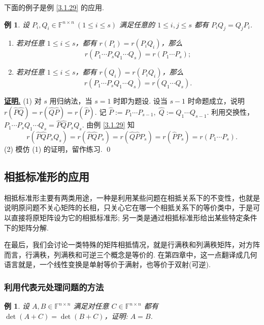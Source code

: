 \documentclass[10pt,openany]{article}
\theoremstyle{thmstyle} %
\theoremstyle{defstyle} %
\theoremstyle{prostyle} %
\theoremstyle{exastyle}
\newtheorem{example}[theorem]{例}
\theoremstyle{remstyle}
\renewenvironment{proof}[1][证明]{\par\underline{\textbf{#1.}} \;\fangsong}{\qed\par}
\newcommand{\F}{\mathbb{F}}
\newcommand{\n}{^{n \times n}}
\begin{document}
下面的例子是例 \ref{3.1.29} 的应用.

\begin{example}
	设 \(  P_i,Q_i \in \F\n \ (1 \leq i \leq s) \) 满足任意的 \( 1 \leq i,j \leq s \) 都有 \( P_iQ_j=Q_jP_i \). 
	\begin{enumerate}[(1)]
		\item 若对任意 \( 1 \leq i \leq s \)，都有 \( r(P_i)=r(P_iQ_i) \)，那么
		\[ r(P_1\cdots P_s Q_1\cdots Q_s)=r(P_1\cdots P_s); \]
		\item 若对任意 \( 1 \leq i \leq s \)，都有 \( r(Q_i)=r(P_iQ_i) \)，那么
		\[ r(P_1\cdots P_s Q_1\cdots Q_s)=r(Q_1\cdots Q_s). \]
	\end{enumerate}
\end{example}

\begin{proof}
	(1) 对 \( s \) 用归纳法，当 \( s=1 \) 时即为题设. 设当 \( s-1 \) 时命题成立，说明 \( r(\hat{P} \hat{Q})=r(\hat{Q}\hat{P})=r(\hat{P}) \). 记 \( \hat{P}:=P_1\cdots P_{s-1}, \; \hat{Q}:=Q_1 \cdots Q_{s-1} \). 利用交换性，\( P_1\cdots P_s Q_1\cdots Q_s=\hat{P}\hat{Q}P_sQ_s \). 由例 \ref{3.1.29} 知 
	\[ r(\hat{P}\hat{Q}P_sQ_s)=r(\hat{P}\hat{Q}P_s)=r(\hat{Q}\hat{P}P_s)=r(\hat{P}P_s)=r(P_1\cdots P_s). \]
   (2) 模仿 (1) 的证明，留作练习.
\end{proof}

\subsection{相抵标准形的应用}

相抵标准形主要有两类用途，一种是利用某些问题在相抵关系下的不变性，也就是说明原问题不关心矩阵的长相，只关心它在哪一个相抵关系下的等价类中，于是可以直接将原矩阵设为它的相抵标准形; 另一类是通过相抵标准形给出某些特定条件下的矩阵分解. 

在最后，我们会讨论一类特殊的矩阵相抵情况，就是行满秩和列满秩矩阵，对方阵而言，行满秩，列满秩和可逆三个概念是等价的. 在第四章中，这一点翻译成几何语言就是，一个线性变换是单射等价于满射，也等价于双射(可逆).

\subsubsection{利用代表元处理问题的方法}

\begin{example}
	设 \( A,B \in \F\n \) 满足对任意 \( C \in \F\n \) 都有 \( \det(A+C)=\det(B+C) \)，证明: \( A=B \).
\end{example}
\end{document}
